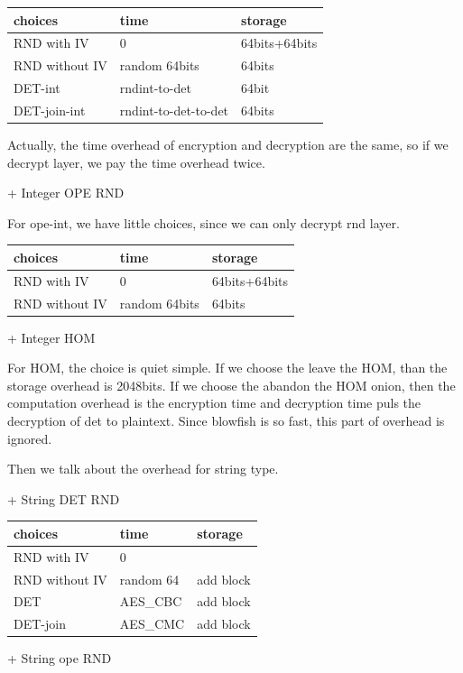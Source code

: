 \begin{tabular}{ | l | l | l |} 
\hline choices & time & storage
\\ \hline RND with IV & 0 & 64bits+64bits
\\ \hline RND without IV & random 64bits & 64bits
\\ \hline DET-int & rndint-to-det & 64bit
\\ \hline DET-join-int & rndint-to-det-to-det & 64bits
\\ \hline \end{tabular}

Actually, the time overhead of encryption and decryption are the same, so if we decrypt layer, we pay the time overhead twice. 


+ Integer OPE RND

For ope-int, we have little choices, since we can only decrypt rnd layer. 

\begin{tabular}{ | l | l | l |} 
\hline choices & time & storage
\\ \hline RND with IV & 0 & 64bits+64bits
\\ \hline RND without IV & random 64bits & 64bits
\\ \hline \end{tabular}



+ Integer HOM

For HOM, the choice is quiet simple. If we choose the leave the HOM, than the storage overhead is 2048bits. If we choose the abandon the HOM onion, then the computation overhead is the encryption time and decryption time puls the decryption of det to plaintext. Since blowfish is so fast, this part of overhead is ignored.

Then we talk about the overhead for string type.


+ String DET RND

\begin{tabular}{ | l | l | l |} 
\hline choices & time & storage
\\ \hline RND with IV & 0 & 
\\ \hline RND without IV & random 64 & add block
\\ \hline DET & AES\_CBC & add block
\\ \hline DET-join & AES\_CMC & add block
\\ \hline \end{tabular}

+ String ope RND


